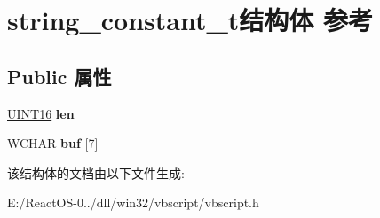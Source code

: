 \hypertarget{structstring__constant__t}{}\section{string\+\_\+constant\+\_\+t结构体 参考}
\label{structstring__constant__t}
\subsection*{Public 属性}
\begin{DoxyCompactItemize}
\item 
\mbox{\label{structstring__constant__t_a3fff2efd72468d6fed4056b11cdab365}} 
\hyperlink{_processor_bind_8h_a09f1a1fb2293e33483cc8d44aefb1eb1}{U\+I\+N\+T16} {\bfseries len}
\item 
\mbox{\label{structstring__constant__t_a925b69c57ef3c820c8fa6182292cd57a}} 
W\+C\+H\+AR {\bfseries buf} \mbox{[}7\mbox{]}
\end{DoxyCompactItemize}


该结构体的文档由以下文件生成\+:\begin{DoxyCompactItemize}
\item 
E\+:/\+React\+O\+S-\/0../dll/win32/vbscript/vbscript.\+h\end{DoxyCompactItemize}
